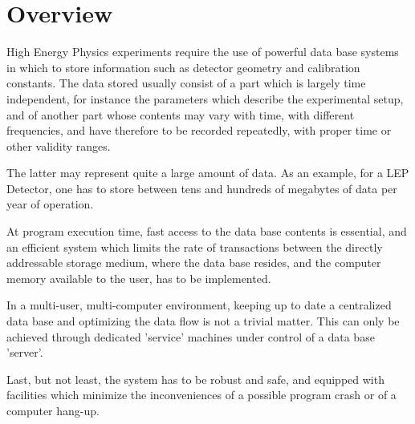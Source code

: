 
\chapter{Overview}

High Energy Physics experiments require the use of powerful
data base systems in which to store information such
as detector geometry and calibration constants.
The data stored usually consist of a part which is largely
time independent, for instance the parameters which describe the
experimental setup, and of another part whose contents may vary with
time, with different frequencies, and have therefore to be recorded
repeatedly, with proper time or other validity ranges.

The latter may represent quite a large amount of data. As an example,
for a LEP Detector, one has to store between tens and hundreds of megabytes
of data per year of operation.

At program execution time, fast access to the data base contents is
essential, and an efficient system which limits the rate of transactions
between the directly addressable storage medium, where the data base
resides, and the computer memory available to the user, has to be
implemented.

In a multi-user, multi-computer environment, keeping up to date a
centralized data base and optimizing the data flow is not a trivial
matter. This can only be achieved through dedicated 'service' machines
under control of a data base 'server'.

Last, but not least, the system has to be robust and safe, and
equipped with facilities which minimize the inconveniences of a
possible program crash or of a computer hang-up.

